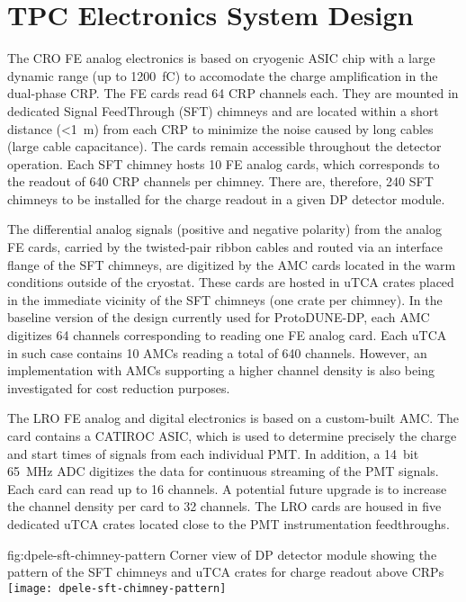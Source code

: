 \section{TPC Electronics System Design}
\label{sec:fddp-tpc-elec-design}

The CRO FE analog electronics is based on cryogenic ASIC chip with a large dynamic range (up to \SI{1200}{\femto\coulomb}) to accomodate the charge amplification in the dual-phase CRP. The FE cards read \num{64} CRP channels each. They are mounted in dedicated Signal FeedThrough (SFT) chimneys and are located within a short distance (\SI{<1}{\metre}) from each CRP to minimize the noise caused by long cables (large cable capacitance). The cards remain accessible throughout the detector operation. Each SFT chimney hosts \num{10} FE analog cards, which corresponds to the readout of \num{640} CRP channels per chimney. There are, therefore, \num{240} SFT chimneys to be installed for the charge readout in a given DP detector module.   

The differential analog signals (positive and negative polarity) from the analog FE cards, carried by the twisted-pair ribbon cables and routed via an interface flange of the SFT chimneys, are digitized by the AMC cards located in the warm conditions outside of the cryostat. These cards are hosted in uTCA crates placed in the immediate vicinity of the SFT chimneys (one crate per chimney). In the baseline version of the design currently used for ProtoDUNE-DP, each AMC digitizes \num{64} channels corresponding to reading one FE analog card. Each uTCA in such case contains \num{10} AMCs reading a total of \num{640} channels. However, an implementation with AMCs supporting a higher channel density is also being investigated for cost reduction purposes.

The LRO FE analog and digital electronics is based on a custom-built AMC. The card contains a CATIROC ASIC, which is used to determine precisely the charge and start times of signals from each individual PMT. In addition, a \SI{14}{bit} \SI{65}{MHz} ADC digitizes the data for continuous streaming of the PMT signals. Each card can read up to \num{16} channels. A potential future upgrade is to increase the channel density per card to \num{32} channels. The LRO cards are housed in five dedicated uTCA crates located close to the PMT instrumentation feedthroughs.

\begin{dunefigure}{fig:dpele-sft-chimney-pattern}
{Corner view of DP detector module showing the pattern of the SFT chimneys and uTCA crates for charge readout above CRPs}
\texttt{[image: dpele-sft-chimney-pattern]}
\end{dunefigure}


